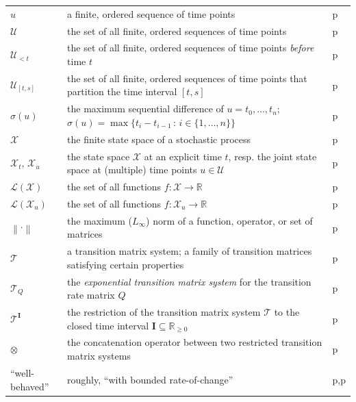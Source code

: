 \documentclass[10pt,a4paper]{paper}
\theoremstyle{definition}
\newcommand{\reals}{\mathbb{R}}
\newcommand{\realsnonneg}{\reals_{\geq 0}}
\newcommand{\states}{\mathcal{X}}
\newcommand{\gambles}{\mathcal{L}}
\newcommand{\gamblesX}{\gambles(\states)}
\newcommand{\norm}[1]{\left\lVert #1 \right\rVert}
\newcommand{\placeref}[1]{p\pageref{#1}}
\begin{document}
\begin{table}[htb]
\begin{tabularx}{\textwidth}{l|X|l}
$u$ & a finite, ordered sequence of time points & \placeref{notation:sequenceset} \\
$\mathcal{U}$ & the set of all finite, ordered sequences of time points & \placeref{notation:sequenceset} \\
$\mathcal{U}_{<t}$ & the set of all finite, ordered sequences of time points \emph{before} time $t$ & \placeref{notation:sequenceset_ineq} \\
$\mathcal{U}_{[t,s]}$ & the set of all finite, ordered sequences of time points that partition the time interval $[t,s]$ & \placeref{notation:sequenceset_partition} \\
$\sigma(u)$ & the maximum sequential difference of $u=t_0,\ldots,t_n$; $\sigma(u)=\max\{t_i-{t_{i-1}}\,:\,i\in\{1,\ldots,n\}\}$ & \placeref{notation:sequenceset_partition} \\
$\states$ & the finite state space of a stochastic process & \placeref{notation:statespace} \\
$\states_t$, $\states_u$ & the state space $\states$ at an explicit time $t$, resp. the joint state space at (multiple) time points $u\in\mathcal{U}$ & \placeref{notation:statespace} \\
$\gamblesX$ & the set of all functions $f: \states\to\reals$ & \placeref{notation:functionspace} \\
$\gambles(\states_u)$ & the set of all functions $f:\states_u\to\reals$ & \placeref{notation:functionspacemulti} \\
$\norm{\cdot}$ & the maximum ($L_\infty$) norm of a function, operator, or set of matrices & \placeref{notation:norm} \\
$\mathcal{T}$ & a transition matrix system; a family of transition matrices satisfying certain properties & \placeref{def:trans_mat_system} \\
$\mathcal{T}_Q$ & the \emph{exponential transition matrix system} for the transition rate matrix $Q$ & \placeref{def:systemfromQ} \\
$\mathcal{T}^\mathbf{I}$ & the restriction of the transition matrix system $\mathcal{T}$ to the closed time interval $\mathbf{I}\subseteq\realsnonneg$ & \placeref{notation:restricted_system} \\
$\otimes$ & the concatenation operator between two restricted transition matrix systems & \placeref{def:concatenation_system} \\
``well-behaved'' & roughly, ``with bounded rate-of-change'' & \placeref{def:well_behaved_trans_mat_system},\placeref{def:well-behaved} \\

\end{tabularx}
\end{table}
\end{document}
